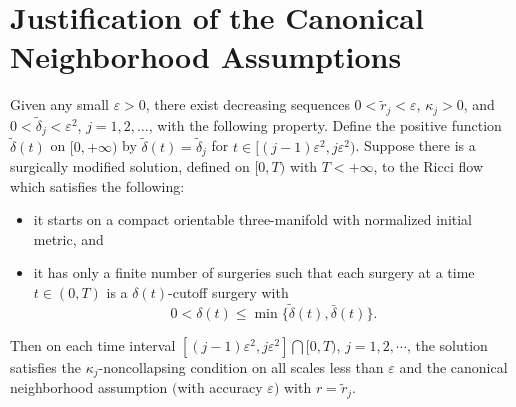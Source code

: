 \section{Justification of the Canonical Neighborhood Assumptions}
\begin{proposition}
  \label{prop:cz-canonical-neighborhood-induction-surgery}
 Given any small $\varepsilon>0$, there exist
decreasing sequences $0<\widetilde{r}_j<\varepsilon$,
$\kappa_j>0$, and $0<\widetilde{\delta}_j<\varepsilon^2 $,
$j=1,2,\ldots$, with the following property. Define the positive
function $\widetilde{\delta}(t)$ on $[0,+\infty)$ by
$\widetilde{\delta}(t) = \widetilde{\delta}_j$ for $t \in
[(j-1)\varepsilon^2,j\varepsilon^2)$. Suppose there is a
surgically modified solution, defined on $[0,T)$ with $T
<+\infty$, to the Ricci flow which satisfies the following:
\begin{itemize}
\item[(1)] it starts on a compact orientable three-manifold with
normalized initial metric, and \item[(2)] it has only a finite
number of surgeries such that each surgery at a time $t \in (0,T)$
is a $\delta(t)$-cutoff surgery with
$$
0 < \delta(t) \leq \min \{\widetilde{\delta}(t),\bar{\delta}(t)\}.
$$
\end{itemize}
Then on each time interval
$[(j-1)\varepsilon^2,j\varepsilon^2]\bigcap [0,T)$, $ j = 1, 2,
\cdots $, the solution satisfies the $\kappa_j$-noncollapsing
condition on all scales less than $\varepsilon$ and the canonical
neighborhood assumption $($with accuracy $\varepsilon)$ with
$r=\widetilde{r}_j$.
\end{proposition}
